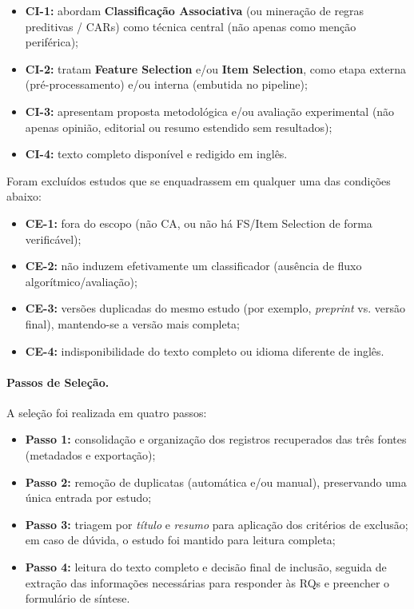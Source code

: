 \begin{itemize}
    \item \textbf{CI-1:} abordam \textbf{Classificação Associativa} (ou mineração de regras preditivas / CARs) como
    técnica central (não apenas como menção periférica);
    \item \textbf{CI-2:} tratam \textbf{Feature Selection} e/ou \textbf{Item Selection}, como etapa externa (pré-processamento)
    e/ou interna (embutida no pipeline);
    \item \textbf{CI-3:} apresentam proposta metodológica e/ou avaliação experimental (não apenas opinião, editorial ou
    resumo estendido sem resultados);
    \item \textbf{CI-4:} texto completo disponível e redigido em inglês.
\end{itemize}

\noindent Foram excluídos estudos que se enquadrassem em qualquer uma das condições abaixo:

\begin{itemize}
    \item \textbf{CE-1:} fora do escopo (não CA, ou não há FS/Item Selection de forma verificável);
    \item \textbf{CE-2:} não induzem efetivamente um classificador (ausência de fluxo algorítmico/avaliação);
    \item \textbf{CE-3:} versões duplicadas do mesmo estudo (por exemplo, \textit{preprint} vs. versão final), mantendo-se
    a versão mais completa;
    \item \textbf{CE-4:} indisponibilidade do texto completo ou idioma diferente de inglês.
\end{itemize}

\paragraph*{Passos de Seleção.}
A seleção foi realizada em quatro passos:

\begin{itemize}
    \item \textbf{Passo 1:} consolidação e organização dos registros recuperados das três fontes (metadados e exportação);
    \item \textbf{Passo 2:} remoção de duplicatas (automática e/ou manual), preservando uma única entrada por estudo;
    \item \textbf{Passo 3:} triagem por \textit{título} e \textit{resumo} para aplicação dos critérios de exclusão; em caso de dúvida,
    o estudo foi mantido para leitura completa;
    \item \textbf{Passo 4:} leitura do texto completo e decisão final de inclusão, seguida de extração das informações
    necessárias para responder às RQs e preencher o formulário de síntese.
\end{itemize}

